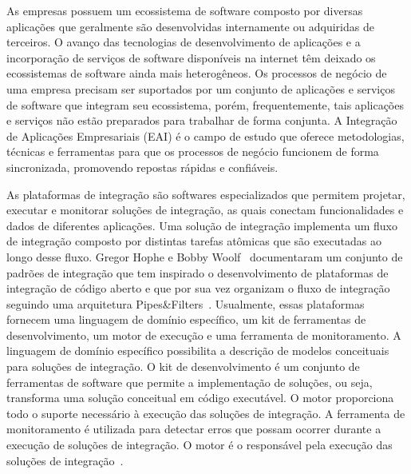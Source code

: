 \documentclass[sigconf]{acmart}
\begin{document}
 
 
 \noindent 
 As empresas possuem um ecossistema de software composto por diversas aplicações que geralmente são desenvolvidas internamente ou adquiridas de terceiros. O avanço das tecnologias de desenvolvimento de aplicações e a incorporação de serviços de software disponíveis na internet têm deixado os ecossistemas de software ainda mais heterogêneos. Os processos de negócio de uma empresa precisam ser suportados por um conjunto de aplicações e serviços de software que integram seu ecossistema, porém, frequentemente, tais aplicações e serviços não estão preparados para trabalhar de forma conjunta. A Integração de Aplicações Empresariais (EAI) é o campo de estudo que oferece metodologias, técnicas e ferramentas para que os processos de negócio funcionem de forma sincronizada, promovendo repostas rápidas e confiáveis.  
 
 As plataformas de integração são softwares especializados que permitem projetar, executar e monitorar soluções de integração, as quais conectam funcionalidades e dados de diferentes aplicações. Uma solução de integração implementa um fluxo de integração composto por distintas tarefas atômicas que são executadas ao longo desse fluxo. Gregor Hophe e Bobby Woolf~\cite{hohpe2004} documentaram um conjunto de padrões de integração que tem inspirado o desenvolvimento de plataformas de integração de código aberto e que por sua vez organizam o fluxo de integração seguindo uma arquitetura Pipes\&Filters~\cite{alexander1977}. 
 Usualmente, essas plataformas fornecem uma linguagem de domínio específico, um kit de ferramentas de desenvolvimento, um motor de execução e uma ferramenta de monitoramento. A linguagem de domínio específico possibilita a descrição de modelos conceituais para soluções de integração. O kit de desenvolvimento é um conjunto de ferramentas de software que permite a implementação de soluções, ou seja, transforma uma solução conceitual em código executável. O motor proporciona todo o suporte necessário à execução das soluções de integração. A ferramenta de monitoramento é utilizada para detectar erros que possam ocorrer durante a execução de soluções de integração. O motor é o responsável pela execução das soluções de integração~\cite{frantz2016}. 
 
\end{document}
